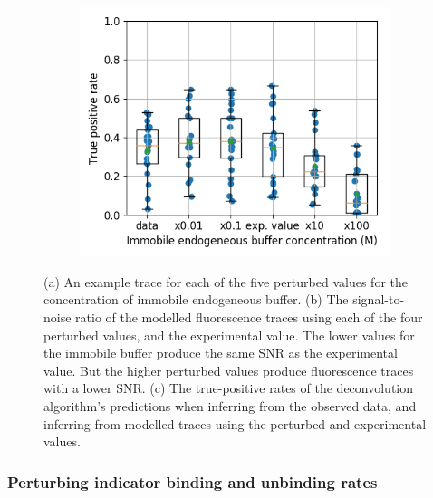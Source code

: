 \documentclass[a4paper,12pt]{article}
\theoremstyle{definition}
\begin{document}
\begin{figure}
\begin{subfigure}{0.5\textwidth}
	   \includegraphics[width=\linewidth]{figures/immobile_perturbed_oasis_first_paper.png}
     \caption{}
  \end{subfigure}
  \caption{(a) An example trace for each of the five perturbed values for the concentration of immobile endogeneous buffer.	(b) The signal-to-noise ratio of the modelled fluorescence traces using each of the four perturbed values, and the experimental value. The lower values for the immobile buffer produce the same SNR as the experimental value. But the higher perturbed values produce fluorescence traces with a lower SNR.	(c) The true-positive rates of the deconvolution algorithm's predictions when inferring from the observed data, and inferring from modelled traces using the perturbed and experimental values.}
  \label{fig:endogeneous_perturbed}
\end{figure}

\subsubsection{Perturbing indicator binding and unbinding rates}
\end{document}
